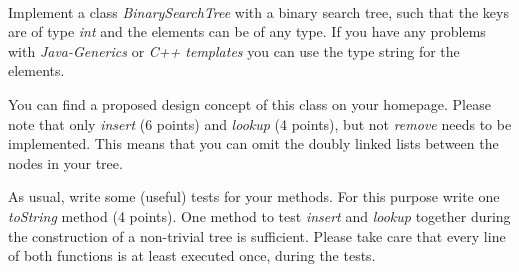  \\
Implement a class  \emph{BinarySearchTree} with a binary search tree, such that 
the keys are of type \emph{int} and the elements can be of any type. If you 
have any problems with \emph{Java-Generics} or \emph{C++ templates} you can use 
the type string for the elements.

You can find a proposed design concept of this class on your homepage.
Please note that only \emph{insert} (6 points) and \emph{lookup} (4 points), 
but not \emph{remove} needs to be implemented. This means that you can omit the 
doubly linked lists between the nodes in your tree.


As usual, write some (useful) tests for your methods. For this purpose write 
one \emph{toString} method (4 points). One method to test \emph{insert} and 
\emph{lookup} together during the construction of a non-trivial tree is 
sufficient. Please take care that every line of both functions is at least 
executed once, during the tests.
